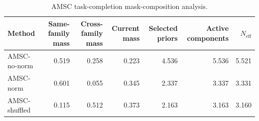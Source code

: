 \begin{table}[ht]
    \caption{AMSC task-completion mask-composition analysis.}
    \label{tbl:amsc_composition}
    \centering
    \scriptsize
    \begin{tabular}{lrrrrrr}
    \toprule
Method & Same-family mass & Cross-family mass & Current mass & Selected priors & Active components & $N_{\mathrm{eff}}$ \\
    \midrule
AMSC-no-norm & 0.519 & 0.258 & 0.223 & 4.536 & 5.536 & 5.521 \\
AMSC-norm & 0.601 & 0.055 & 0.345 & 2.337 & 3.337 & 3.331 \\
AMSC-shuffled & 0.115 & 0.512 & 0.373 & 2.163 & 3.163 & 3.160 \\
    \bottomrule
    \end{tabular}
\end{table}
